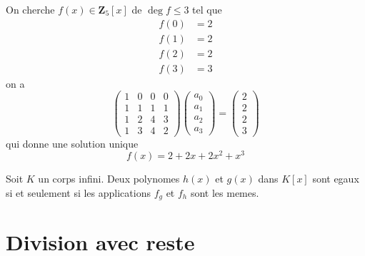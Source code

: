 \begin{example}
On cherche $f(x)\in \mathbf{Z}_{5}[x]$ de $\deg f\leq3$ tel que 
\begin{align*}
f(0) & =2 \\
f(1) & =2 \\
f(2) & =2 \\
f(3) & =3
\end{align*}
on a 
$$
\begin{pmatrix}
1 & 0 & 0 & 0 \\
1 & 1 & 1 & 1 \\
1 & 2 & 4 & 3 \\
1 & 3 & 4 & 2
\end{pmatrix}\begin{pmatrix}
a_{0} \\
a_{1} \\
a_{2} \\
a_{3}
\end{pmatrix}=\begin{pmatrix}
2 \\
2 \\
2 \\
3
\end{pmatrix}
$$
qui donne une solution unique
$$
f(x)=2+2x+2x^{2}+x^{3}
$$
\end{example}
\begin{corollary}
Soit $K$ un corps infini. Deux polynomes $h(x)$ et $g(x)$ dans $K[x]$ sont egaux si et seulement si les applications $f_{g}$ et $f_{h}$ sont les memes.
\end{corollary}

\section{Division avec reste}

